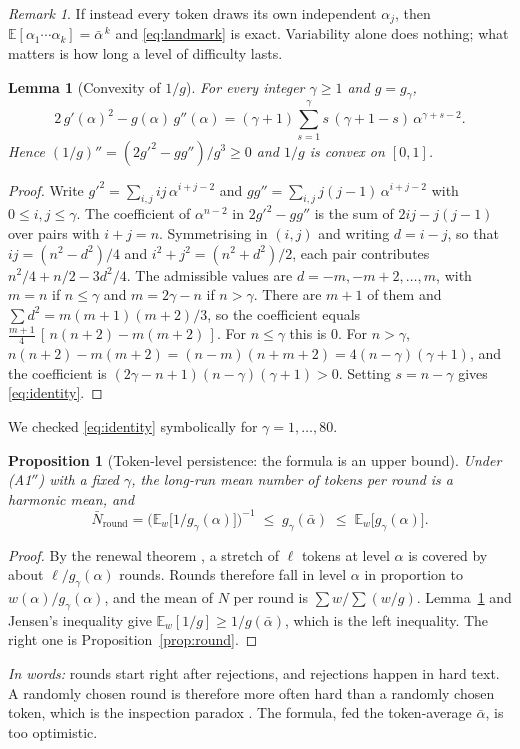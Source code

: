 \documentclass[10pt]{article}
\newtheorem{lemma}{Lemma}
\newtheorem{proposition}{Proposition}
\theoremstyle{remark}
\newtheorem*{remark}{Remark}
\newcommand{\E}{\mathbb{E}}
\newcommand{\abar}{\bar{\alpha}}
\begin{document}
\begin{remark}
If instead every token draws its own independent $\alpha_j$, then $\E[\alpha_1\cdots\alpha_k]=\abar^{\,k}$ and
\eqref{eq:landmark} is exact. Variability alone does nothing; what matters is how long a level of difficulty lasts.
\end{remark}

\begin{lemma}[Convexity of $1/g$]\label{lem:convex}
For every integer $\gamma\ge1$ and $g=g_\gamma$,
\begin{equation}\label{eq:identity}
2\,g'(\alpha)^2-g(\alpha)\,g''(\alpha)=(\gamma+1)\sum_{s=1}^{\gamma}s\,(\gamma+1-s)\,\alpha^{\gamma+s-2}.
\end{equation}
Hence $(1/g)''=(2g'^2-gg'')/g^3\ge0$ and $1/g$ is convex on $[0,1]$.
\end{lemma}
\begin{proof}
Write $g'^2=\sum_{i,j}ij\,\alpha^{i+j-2}$ and $gg''=\sum_{i,j}j(j-1)\,\alpha^{i+j-2}$ with $0\le i,j\le\gamma$. The
coefficient of $\alpha^{n-2}$ in $2g'^2-gg''$ is the sum of $2ij-j(j-1)$ over pairs with $i+j=n$. Symmetrising in
$(i,j)$ and writing $d=i-j$, so that $ij=(n^2-d^2)/4$ and $i^2+j^2=(n^2+d^2)/2$, each pair contributes
$n^2/4+n/2-3d^2/4$. The admissible values are $d=-m,-m+2,\dots,m$, with $m=n$ if $n\le\gamma$ and $m=2\gamma-n$ if
$n>\gamma$. There are $m+1$ of them and $\sum d^2=m(m+1)(m+2)/3$, so the coefficient equals
$\tfrac{m+1}{4}\,[\,n(n+2)-m(m+2)\,]$. For $n\le\gamma$ this is $0$. For $n>\gamma$,
$n(n+2)-m(m+2)=(n-m)(n+m+2)=4(n-\gamma)(\gamma+1)$, and the coefficient is $(2\gamma-n+1)(n-\gamma)(\gamma+1)>0$.
Setting $s=n-\gamma$ gives \eqref{eq:identity}.
\end{proof}
\noindent We checked \eqref{eq:identity} symbolically for $\gamma=1,\dots,80$.

\begin{proposition}[Token-level persistence: the formula is an upper bound]\label{prop:token}
Under (A1$''$) with a fixed $\gamma$, the long-run mean number of tokens per round is a harmonic mean, and
\begin{equation}\label{eq:harmonic}
\bar N_{\mathrm{round}}=\Big(\E_w\big[1/g_\gamma(\alpha)\big]\Big)^{-1}\;\le\;g_\gamma(\abar)\;\le\;\E_w\big[g_\gamma(\alpha)\big].
\end{equation}
\end{proposition}
\begin{proof}
By the renewal theorem \cite{ross}, a stretch of $\ell$ tokens at level $\alpha$ is covered by about
$\ell/g_\gamma(\alpha)$ rounds. Rounds therefore fall in level $\alpha$ in proportion to $w(\alpha)/g_\gamma(\alpha)$, and the
mean of $N$ per round is $\sum w/\sum (w/g)$. Lemma~\ref{lem:convex} and Jensen's inequality give
$\E_w[1/g]\ge1/g(\abar)$, which is the left inequality. The right one is Proposition~\ref{prop:round}.
\end{proof}
\noindent\emph{In words:} rounds start right after rejections, and rejections happen in hard text. A randomly chosen
round is therefore more often hard than a randomly chosen token, which is the inspection paradox \cite{ross}.
The formula, fed the token-average $\abar$, is too optimistic.
\end{document}

